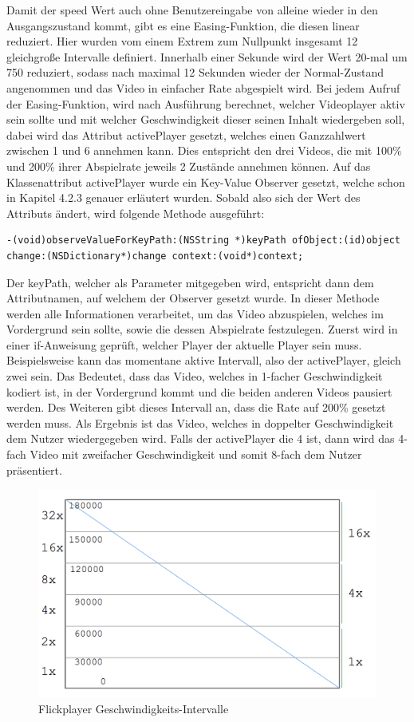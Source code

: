 \documentclass[11pt,a4paper]{report}
\begin{document}
Damit der speed Wert auch ohne Benutzereingabe von alleine wieder in den Ausgangszustand kommt, gibt es eine Easing-Funktion, die diesen linear reduziert. Hier wurden vom einem Extrem zum Nullpunkt insgesamt 12 gleichgroße Intervalle definiert. Innerhalb einer Sekunde wird der Wert 20-mal um 750 reduziert, sodass nach maximal 12 Sekunden wieder der Normal-Zustand angenommen und das Video in einfacher Rate abgespielt wird. Bei jedem Aufruf der Easing-Funktion, wird nach Ausführung berechnet, welcher Videoplayer aktiv sein sollte und mit welcher Geschwindigkeit dieser seinen Inhalt wiedergeben soll, dabei wird das Attribut activePlayer gesetzt, welches einen Ganzzahlwert zwischen 1 und 6 annehmen kann. Dies entspricht den drei Videos, die mit 100\% und 200\% ihrer Abspielrate jeweils 2 Zustände annehmen können. Auf das Klassenattribut activePlayer wurde ein Key-Value Observer gesetzt, welche schon in Kapitel 4.2.3 genauer erläutert wurden. Sobald also sich der Wert des Attributs ändert, wird folgende Methode ausgeführt:
\begin{lstlisting}
-(void)observeValueForKeyPath:(NSString *)keyPath ofObject:(id)object change:(NSDictionary*)change context:(void*)context;
\end{lstlisting}
Der keyPath, welcher als Parameter mitgegeben wird, entspricht dann dem Attributnamen, auf welchem der Observer gesetzt wurde. In dieser Methode werden alle Informationen verarbeitet, um das Video abzuspielen, welches im Vordergrund sein sollte, sowie die dessen Abspielrate festzulegen. Zuerst wird in einer if-Anweisung geprüft, welcher Player der aktuelle Player sein muss. Beispielsweise kann das momentane aktive Intervall, also der activePlayer, gleich zwei sein. Das Bedeutet, dass das Video, welches in 1-facher Geschwindigkeit kodiert ist, in der Vordergrund kommt und die beiden anderen Videos pausiert werden. Des Weiteren gibt dieses Intervall an, dass die Rate auf 200\% gesetzt werden muss. Als Ergebnis ist das Video, welches in doppelter Geschwindigkeit dem Nutzer wiedergegeben wird. Falls der activePlayer die 4 ist, dann wird das 4-fach Video mit zweifacher Geschwindigkeit und somit 8-fach dem Nutzer präsentiert.
\begin{figure}[h]
\begin{center}
\includegraphics[scale=0.4]{./images/29.png}
\caption{Flickplayer Geschwindigkeits-Intervalle}
\label{flickplayer_interval}
\end{center}
\end{figure}
\end{document}
